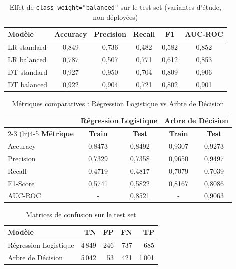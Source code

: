 \documentclass[12pt,a4paper,openany]{report}
\begin{document}
\begin{table}[H]
    \centering
    \caption{Effet de \texttt{class\_weight="balanced"} sur le test set (variantes d'étude, non déployées)}
    \label{tab:class-weight}
    \begin{tabular}{l c c c c c}
        \toprule
        \textbf{Modèle} & \textbf{Accuracy} & \textbf{Precision} & \textbf{Recall} & \textbf{F1} & \textbf{AUC-ROC} \\
        \midrule
        LR standard  & 0,849 & 0,736 & 0,482 & 0,582 & 0,852 \\
        LR balanced  & 0,787 & 0,507 & 0,771 & 0,612 & 0,853 \\
        DT standard  & 0,927 & 0,950 & 0,704 & 0,809 & 0,906 \\
        DT balanced  & 0,922 & 0,904 & 0,721 & 0,802 & 0,901 \\
        \bottomrule
    \end{tabular}
\end{table}

\begin{table}[H]
    \centering
    \caption{Métriques comparatives : Régression Logistique vs Arbre de Décision}
    \label{tab:metrics}
    \begin{tabular}{l cc cc}
        \toprule
        & \multicolumn{2}{c}{\textbf{Régression Logistique}} & \multicolumn{2}{c}{\textbf{Arbre de Décision}} \\
        \cmidrule(lr){2-3} \cmidrule(lr){4-5}
        \textbf{Métrique} & \textbf{Train} & \textbf{Test} & \textbf{Train} & \textbf{Test} \\
        \midrule
        Accuracy  & 0,8473 & 0,8492 & 0,9307 & 0,9273 \\
        Precision & 0,7329 & 0,7358 & 0,9650 & 0,9497 \\
        Recall    & 0,4719 & 0,4817 & 0,7079 & 0,7039 \\
        F1-Score  & 0,5741 & 0,5822 & 0,8167 & 0,8086 \\
        AUC-ROC   & -    & 0,8521 & -    & 0,9063 \\
        \bottomrule
    \end{tabular}
\end{table}

\begin{table}[H]
    \centering
    \caption{Matrices de confusion sur le test set}
    \label{tab:confusion}
    \begin{tabular}{l rrrr}
        \toprule
        \textbf{Modèle} & \textbf{TN} & \textbf{FP} & \textbf{FN} & \textbf{TP} \\
        \midrule
        Régression Logistique & 4\,849 & 246 & 737  & 685 \\
        Arbre de Décision     & 5\,042 &  53 & 421  & 1\,001 \\
        \bottomrule
    \end{tabular}
\end{table}
\end{document}
